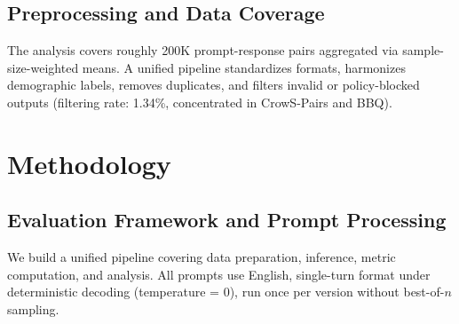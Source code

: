 \documentclass[11pt]{article}
\begin{document}
\begin{table}[t]
\centering\small
{}
\caption{Transition classification. Release transitions included in longitudinal aggregates; scale and cross-tier ($^\dagger$) excluded.}
\label{tab:comparison_types}
\end{table}

\subsection{Preprocessing and Data Coverage}
The analysis covers roughly 200K prompt-response pairs aggregated via sample-size-weighted means. A unified pipeline standardizes formats, harmonizes demographic labels, removes duplicates, and filters invalid or policy-blocked outputs (filtering rate: 1.34\%, concentrated in CrowS-Pairs and BBQ).

\section{Methodology}

\subsection{Evaluation Framework and Prompt Processing}
We build a unified pipeline covering data preparation, inference, metric computation, and analysis. All prompts use English, single-turn format under deterministic decoding (temperature = 0), run once per version without best-of-$n$ sampling.
\end{document}

